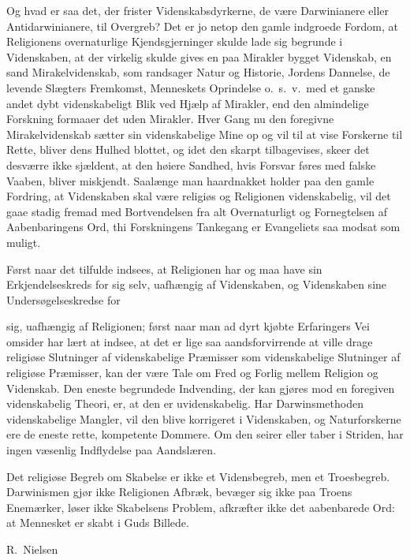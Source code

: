 \documentclass[12pt,a4paper]{article}
\begin{document}
Og hvad er saa det, der frister Videnskabsdyrkerne, de være
Darwinianere eller Antidarwinianere, til Overgreb? Det er jo netop den
gamle indgroede Fordom, at Religionens overnaturlige Kjendsgjerninger
skulde lade sig begrunde i Videnskaben, at der virkelig skulde gives en
paa Mirakler bygget Videnskab, en sand Mirakelvidenskab, som randsager
Natur og Historie, Jordens Dannelse, de levende Slægters Fremkomst,
Menneskets Oprindelse o.\ s.\ v.\ med et ganske andet dybt
videnskabeligt Blik ved Hjælp af Mirakler, end den almindelige
Forskning formaaer det uden Mirakler. Hver Gang nu den foregivne
Mirakelvidenskab sætter sin videnskabelige Mine op og vil til at vise
Forskerne til Rette, bliver dens Hulhed blottet, og idet den skarpt
tilbagevises, skeer det desværre ikke sjældent, at den høiere Sandhed,
hvis Forsvar føres med falske Vaaben, bliver miskjendt. Saalænge man
haardnakket holder paa den gamle Fordring, at Videnskaben skal være
religiøs og Religionen videnskabelig, vil det gaae stadig fremad med
Bortvendelsen fra alt Overnaturligt og Fornegtelsen af Aabenbaringens
Ord, thi Forskningens Tankegang er Evangeliets saa modsat som muligt.

Først naar det tilfulde indsees, at Religionen har og maa have sin
Erkjendelseskreds for sig selv, uafhængig af Videnskaben, og
Videnskaben sine Undersøgelseskredse for


sig, uafhængig af Religionen; først naar man ad dyrt kjøbte Erfaringers
Vei omsider har lært at indsee, at det er lige saa aandsforvirrende at
ville drage religiøse Slutninger af videnskabelige Præmisser som
videnskabelige Slutninger af religiøse Præmisser, kan der være Tale om
Fred og Forlig mellem Religion og Videnskab. Den eneste begrundede
Indvending, der kan gjøres mod en foregiven videnskabelig Theori, er,
at den er uvidenskabelig. Har Darwinsmethoden videnskabelige Mangler,
vil den blive korrigeret i Videnskaben, og Naturforskerne ere de eneste
rette, kompetente Dommere. Om den seirer eller taber i Striden, har
ingen væsenlig Indflydelse paa Aandslæren.

Det religiøse Begreb om Skabelse er ikke et Vidensbegreb, men et
Troesbegreb. Darwinismen gjør ikke Religionen Afbræk, bevæger sig ikke
paa Troens Enemærker, løser ikke Skabelsens Problem, afkræfter ikke
det aabenbarede Ord: at Mennesket er skabt i Guds Billede.

\medskip
\begin{flushright}
R.\ Nielsen
\end{flushright}
\end{document}
